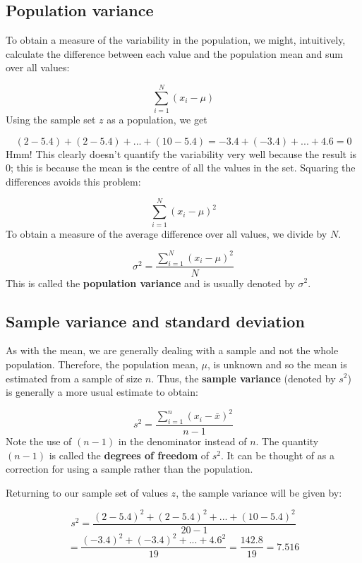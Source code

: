 \documentclass[
  oneside]{krantz}
\begin{document}
\hypertarget{population-variance}{%
\subsection{Population variance}\label{population-variance}}

To obtain a measure of the variability in the population, we might, intuitively, calculate the difference between each value and the population mean and sum over all values:

\[ \sum_{i=1}^{N} (x_i - \mu) \]
Using the sample set \(z\) as a population, we get

\[(2-5.4) + (2-5.4) + ... + (10-5.4) = -3.4 + (-3.4) + ...+ 4.6 = 0\]
Hmm! This clearly doesn't quantify the variability very well because the result is 0; this is because the mean is the centre of all the values in the set. Squaring the differences avoids this problem:

\[ \sum_{i=1}^{N} (x_i - \mu)^2 \]
To obtain a measure of the average difference over all values, we divide by \(N\).

\[\sigma^2 = \frac{\sum_{i=1}^N{(x_i - \mu)^2}}{N} \]
This is called the \textbf{population variance} and is usually denoted by \(\sigma^2\).

\hypertarget{sample-variance-and-standard-deviation}{%
\subsection{Sample variance and standard deviation}\label{sample-variance-and-standard-deviation}}

As with the mean, we are generally dealing with a sample and not the whole population. Therefore, the population mean, \(\mu\), is unknown and so the mean is estimated from a sample of size \(n\). Thus, the \textbf{sample variance} (denoted by \(s^2\)) is generally a more usual estimate to obtain:

\[s^2 = \frac{\sum_{i=1}^n{(x_i - \bar x)^2}}{n-1} \]
Note the use of \((n-1)\) in the denominator instead of \(n\). The quantity \((n-1)\) is called the \textbf{degrees of freedom} of \(s^2\). It can be thought of as a correction for using a sample rather than the population.

Returning to our sample set of values \(z\), the sample variance will be given by:

\[s^2 = \frac{(2-5.4)^2 + (2-5.4)^2 + ... + (10-5.4)^2}{20-1}\]
\[ = \frac{(-3.4)^2 + (-3.4)^2 + ...+ 4.6^2}{19} = \frac{142.8}{19} = 7.516\]
\end{document}
